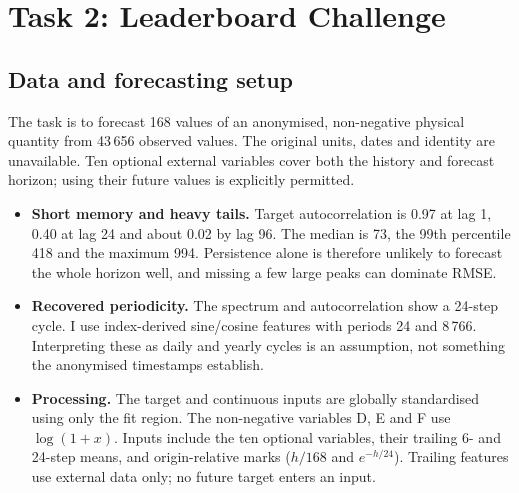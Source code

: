 \section{Task 2: Leaderboard Challenge}

\subsection{Data and forecasting setup}
The task is to forecast 168 values of an anonymised, non-negative physical quantity
from 43\,656 observed values. The original units, dates and identity are unavailable.
Ten optional external variables cover both the history and forecast horizon;
using their future values is explicitly permitted.
\begin{itemize}
  \item \textbf{Short memory and heavy tails.} Target autocorrelation is 0.97 at lag 1,
        0.40 at lag 24 and about 0.02 by lag 96. The median is 73, the 99th percentile
        418 and the maximum 994. Persistence alone is therefore unlikely to forecast
        the whole horizon well, and missing a few large peaks can dominate RMSE.
  \item \textbf{Recovered periodicity.} The spectrum and autocorrelation show a
        24-step cycle. I use index-derived sine/cosine features with periods 24 and
        8\,766. Interpreting these as daily and yearly cycles is an assumption,
        not something the anonymised timestamps establish.
  \item \textbf{Processing.} The target and continuous inputs are globally
        standardised using only the fit region. The non-negative variables D, E and F
        use $\log(1+x)$. Inputs include the ten optional variables, their trailing
        6- and 24-step means, and origin-relative marks ($h/168$ and $e^{-h/24}$).
        Trailing features use external data only; no future target enters an input.
\end{itemize}

